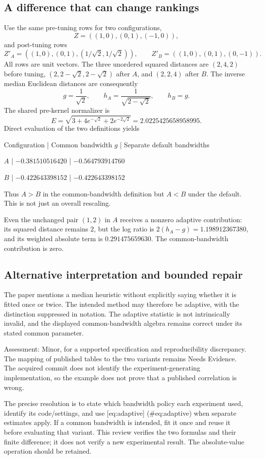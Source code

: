 \documentclass[10pt]{article}
\begin{document}
\subsection*{A difference that can change rankings}
Use the same pre-tuning rows for two configurations, \[Z=((1,0),(0,1),(-1,0)),\] and post-tuning rows \[Z'_A=((1,0),(0,1),(1/\sqrt2,1/\sqrt2)),\qquad
Z'_B=((1,0),(0,1),(0,-1)).\] All rows are unit vectors. The three unordered squared distances are \((2,4,2)\) before tuning, \((2,2-\sqrt2,2-\sqrt2)\) after \(A\), and \((2,2,4)\) after \(B\). The inverse median Euclidean distances are consequently \[g=\frac{1}{\sqrt2},\qquad
h_A=\frac{1}{\sqrt{2-\sqrt2}},\qquad h_B=g.\] The shared pre-kernel normalizer is \[E=\sqrt{3+4e^{-\sqrt2}+2e^{-2\sqrt2}}
  =2.0225425658958995.\] Direct evaluation of the two definitions yields\par
Configuration | Common bandwidth \(g\) | Separate default bandwidths\par
\(A\) | \(-0.381510516420\) | \(-0.564793914760\)\par
\(B\) | \(-0.422643398152\) | \(-0.422643398152\)\par
Thus \(A>B\) in the common-bandwidth definition but \(A<B\) under the default. This is not just an overall rescaling.\par
Even the unchanged pair \((1,2)\) in \(A\) receives a nonzero adaptive contribution: its squared distance remains \(2\), but the log ratio is \(2(h_A-g)=1.198912367380\), and its weighted absolute term is \(0.291475659630\). The common-bandwidth contribution is zero.\par
\subsection*{Alternative interpretation and bounded repair}
The paper mentions a median heuristic without explicitly saying whether it is fitted once or twice. The intended method may therefore be adaptive, with the distinction suppressed in notation. The adaptive statistic is not intrinsically invalid, and the displayed common-bandwidth algebra remains correct under its stated common parameter.\par
Assessment: Minor, for a supported specification and reproducibility discrepancy. The mapping of published tables to the two variants remains Needs Evidence. The acquired commit does not identify the experiment-generating implementation, so the example does not prove that a published correlation is wrong.\par
The precise resolution is to state which bandwidth policy each experiment used, identify its code/settings, and use [eq:adaptive] (\#eq:adaptive) when separate estimates apply. If a common bandwidth is intended, fit it once and reuse it before evaluating that variant. This review verifies the two formulas and their finite difference; it does not verify a new experimental result. The absolute-value operation should be retained.\par
\end{document}
